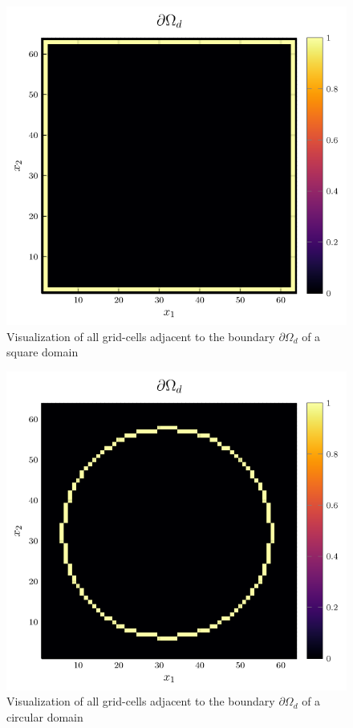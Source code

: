 \documentclass{mimosis}
\begin{document}
\begin{figure}[htbp]
\centering
\includegraphics[width=.9\linewidth]{images/boundary.png}
\caption{\label{fig:boundary-square}Visualization of all grid-cells adjacent to the boundary \(\partial \Omega_{d}\) of a square domain}
\end{figure}



\begin{figure}[htbp]
\centering
\includegraphics[width=.9\linewidth]{images/boundary-circle.png}
\caption{\label{fig:boundary-circle}Visualization of all grid-cells adjacent to the boundary \(\partial \Omega_{d}\) of a circular domain}
\end{figure}
\end{document}
